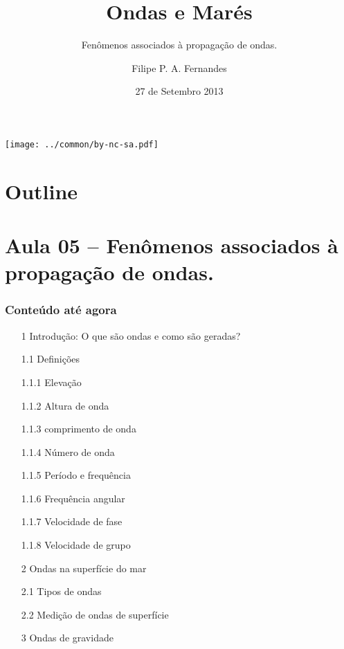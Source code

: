 
\title[Aula 05]{Ondas e Marés}
\subtitle{Fenômenos associados à propagação de ondas.}
\author[Filipe Fernandes]{Filipe P. A. Fernandes}
\date[Setembro 2013]{27 de Setembro 2013}




\begin{frame}[plain]
  \titlepage
  \begin{center}
    \texttt{[image: ../common/by-nc-sa.pdf]}
  \end{center}
\end{frame}

\section*{Outline}
\begin{frame}
\tableofcontents
\end{frame}

\section{Aula 05 -- Fenômenos associados à propagação de ondas.}
\begin{frame}
\frametitle{Conteúdo até agora}
{\scriptsize
  \begin{itemize}[<+-| alert@+>]
    \item[1] Introdução: O que são ondas e como são geradas?
    \item[1.1] Definições
    \item[1.1.1] Elevação
    \item[1.1.2] Altura de onda
    \item[1.1.3] comprimento de onda
    \item[1.1.4] Número de onda
    \item[1.1.5] Período e frequência
    \item[1.1.6] Frequência angular
    \item[1.1.7] Velocidade de fase
    \item[1.1.8] Velocidade de grupo
    \item[2] Ondas na superfície do mar
    \item[2.1] Tipos de ondas
    \item[2.2] Medição de ondas de superfície
    \item[3] Ondas de gravidade
  \end{itemize}
  }
\end{frame}


